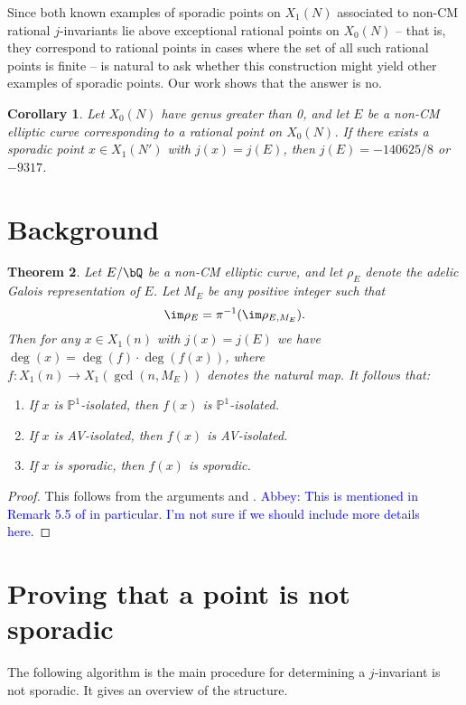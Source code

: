 \documentclass[11pt,reqno]{amsart}
\theoremstyle{plain}
\newtheorem{theorem}{Theorem}%
\newtheorem{corollary}[theorem]{Corollary}
\theoremstyle{definition}
\newcommand{\Q}{\bQ}
\newcommand{\abbey}[1]{\textcolor{blue}{Abbey: #1}}
\begin{document}
Since both known examples of sporadic points on $X_1(N)$ associated to non-CM rational $j$-invariants lie above exceptional rational points on $X_0(N)$ -- that is, they correspond to rational points in cases where the set of all such rational points is finite -- is natural to ask whether this construction might yield other examples of sporadic points. Our work shows that the answer is no.
\begin{corollary}
Let $X_0(N)$ have genus greater than 0, and let $E$ be a non-CM elliptic curve corresponding to a rational point on $X_0(N)$. If there exists a sporadic point $x \in X_1(N')$ with $j(x)=j(E)$, then $j(E) =-140625/8$ or $-9317$.
\end{corollary}

\section{Background}

\begin{theorem}
Let $E/\Q$ be a non-CM elliptic curve, and let $\rho_E$ denote the adelic Galois representation of $E$. Let $M_E$ be any positive integer such that
\[
\im \rho_E=\pi^{-1}(\im \rho_{E, M_E}).
\]
Then for any $x \in X_1(n)$ with $j(x)=j(E)$ we have $\deg(x)=\deg(f)\cdot \deg(f(x))$, where $f: X_1(n) \rightarrow X_1(\gcd(n,M_E))$ denotes the natural map. It follows that:
\begin{enumerate}
\item If $x$ is $\mathbb{P}^1$-isolated, then $f(x)$ is $\mathbb{P}^1$-isolated.
\item If $x$ is AV-isolated, then $f(x)$ is AV-isolated.
\item If $x$ is sporadic, then $f(x)$ is sporadic.
\end{enumerate}
\end{theorem}

\begin{proof}
This follows from the arguments \cite[$\S5.3$]{BELOV} and \cite[Theorem 4.3]{BELOV}. \abbey{This is mentioned in Remark 5.5 of \cite{BELOV} in particular. I'm not sure if we should include more details here.}
\end{proof}

\section{Proving that a point is not sporadic}
The following algorithm is the main procedure for determining a $j$-invariant is not sporadic. It gives an overview of the structure.
\end{document}

